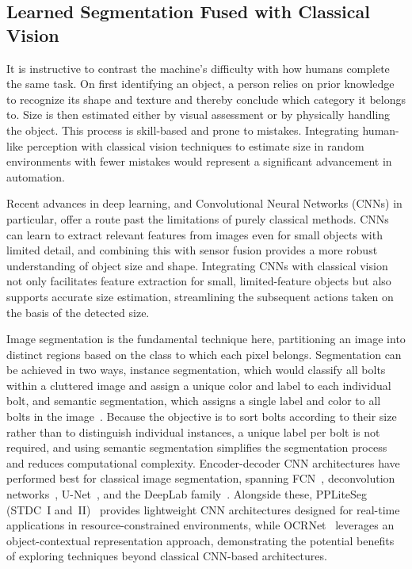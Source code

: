 \subsection{Learned Segmentation Fused with Classical Vision}\label{subsec:intro_learned_vision}

It is instructive to contrast the machine's difficulty with how humans complete the same task. On
first identifying an object, a person relies on prior knowledge to recognize its shape and texture
and thereby conclude which category it belongs to. Size is then estimated either by visual
assessment or by physically handling the object. This process is skill-based and prone to mistakes.
Integrating human-like perception with classical vision techniques to estimate size in random
environments with fewer mistakes would represent a significant advancement in
automation.

Recent advances in deep learning, and Convolutional Neural Networks (CNNs) in particular, offer a
route past the limitations of purely classical methods. CNNs can learn to extract relevant features
from images even for small objects with limited detail, and combining this with sensor fusion
provides a more robust understanding of object size and shape. Integrating CNNs with classical
vision not only facilitates feature extraction for small, limited-feature objects but also supports
accurate size estimation, streamlining the subsequent actions taken on the basis of the detected
size.

Image segmentation is the fundamental technique here, partitioning an image into distinct regions
based on the class to which each pixel belongs. Segmentation can be achieved in two ways, instance
segmentation, which would classify all bolts within a cluttered image and assign a unique color and
label to each individual bolt, and semantic segmentation, which assigns a single label and color to
all bolts in the image~\citep{yin2022bridging}. Because the objective is to sort bolts according to
their size rather than to distinguish individual instances, a unique label per bolt is not required,
and using semantic segmentation simplifies the segmentation process and reduces computational
complexity. Encoder-decoder CNN architectures have performed best for
classical image segmentation, spanning FCN~\citep{long2015fully}, deconvolution
networks~\citep{noh2015learning}, U-Net~\citep{ronneberger2015unet}, and the DeepLab
family~\citep{mo2022review}. Alongside these, PPLiteSeg (STDC~I and~II)~\citep{peng2022ppliteseg}
provides lightweight CNN architectures designed for real-time applications in resource-constrained
environments, while OCRNet~\citep{yuan2020ocrnet} leverages an object-contextual representation
approach, demonstrating the potential benefits of exploring techniques beyond classical CNN-based
architectures.

